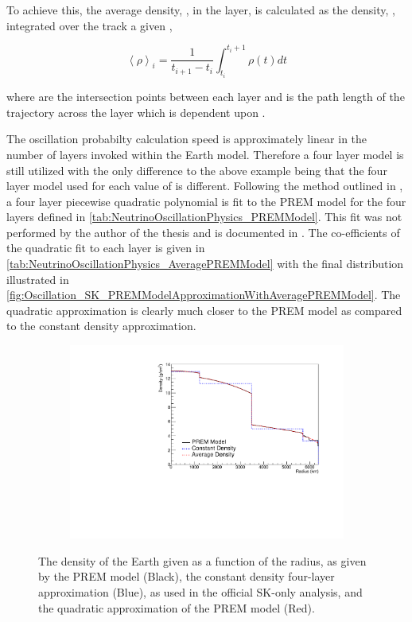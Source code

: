 To achieve this, the average density, , in the  layer, is calculated as the density, \quickmath{\rho}, integrated over the track a given ,

\begin{equation}
  \left< \rho \right>_{i} = \frac{1}{t_{i+1}-t_{i}} \int^{t_{i}+1}_{t_{i}} \rho(t) dt
\end{equation}

where  are the intersection points between each layer and  is the path length of the trajectory across the layer which is dependent upon .

The oscillation probabilty calculation speed is approximately linear in the number of layers invoked within the Earth model. Therefore a four layer model is still utilized with the only difference to the above example being that the four layer model used for each value of  is different. Following the method outlined in \cite{EarthGrav}, a four layer piecewise quadratic polynomial is fit to the PREM model for the four layers defined in \autoref{tab:NeutrinoOscillationPhysics_PREMModel}. This fit was not performed by the author of the thesis and is documented in \cite{t2k_tn_425}. The co-efficients of the quadratic fit to each layer is given in \autoref{tab:NeutrinoOscillationPhysics_AveragePREMModel} with the final distribution illustrated in \autoref{fig:Oscillation_SK_PREMModelApproximationWithAveragePREMModel}. The quadratic approximation is clearly much closer to the PREM model as compared to the constant density approximation.

\begin{figure}[h]
  \begin{subfigure}[t]{0.8\textwidth}
    \includegraphics[width=\textwidth, trim={0mm 0mm 0mm 0mm}, clip,page=1]{Figures/Oscillation/DensityComparisonWithAveragePREM.pdf}
  \end{subfigure}
  \caption{The density of the Earth given as a function of the radius, as given by the PREM model (Black), the constant density four-layer approximation (Blue), as used in the official SK-only analysis, and the quadratic approximation of the PREM model (Red).}
  \label{fig:Oscillation_SK_PREMModelApproximationWithAveragePREMModel}
\end{figure}

